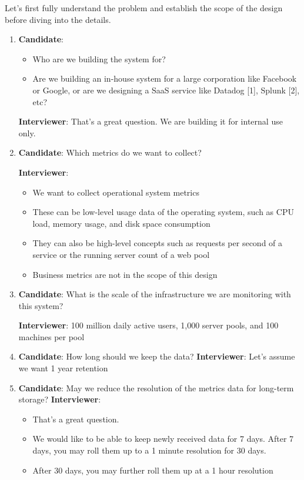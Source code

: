 \documentclass{report}
\theoremstyle{definition}
\begin{document}
Let's first fully understand the problem and establish the scope of the design before diving into the details.


\begin{enumerate}
\item
\textbf{Candidate}:

\begin{itemize}
\item
Who are we building the system for?
\item
Are we building an in-house system for a large corporation like Facebook or Google, or are we designing a SaaS service like Datadog [1], Splunk [2], etc?
\end{itemize}

\textbf{Interviewer}:
That's a great question. We are building it for internal use only.

\item
\textbf{Candidate}:
Which metrics do we want to collect?

\textbf{Interviewer}:
\begin{itemize}
\item
We want to collect operational system metrics
\item
These can be low-level usage data of the operating system, such as CPU load, memory usage, and disk space consumption
\item
They can also be high-level concepts such as requests per second of a service or the running server count of a web pool
\item
Business metrics are not in the scope of this design
\end{itemize}


\item
\textbf{Candidate}:
What is the scale of the infrastructure we are monitoring with this system?

\textbf{Interviewer}:
100 million daily active users, 1,000 server pools, and 100 machines per pool
\item
\textbf{Candidate}: How long should we keep the data?
\textbf{Interviewer}: Let's assume we want 1 year retention

\item
\textbf{Candidate}: May we reduce the resolution of the metrics data for long-term storage?
\textbf{Interviewer}:

\begin{itemize}
\item
That's a great question.
\item
We would like to be able to keep newly received data for 7 days. After 7 days, you may roll them up to a 1 minute resolution for 30 days.
\item
After 30 days, you may further roll them up at a 1 hour resolution
\end{itemize}


\end{enumerate}
\end{document}
